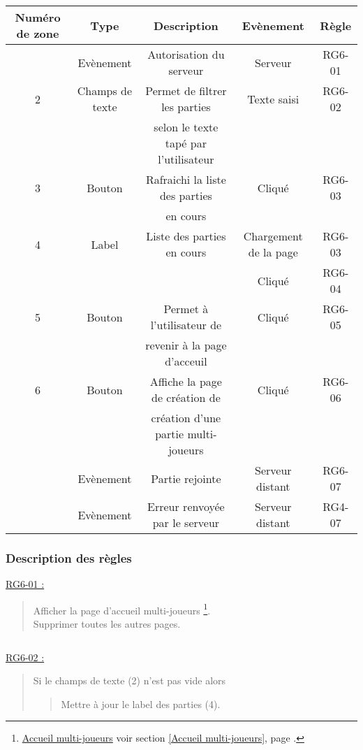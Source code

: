 \documentclass{report}
\begin{document}
			\begin{tabular}{|c|c|c|c|c|} \hline
				Numéro de zone & Type  & Description & Evènement &	Règle \\\hline
				  & Evènement & Autorisation du serveur & Serveur & RG6-01 \\\hline
				2 & Champs de texte & Permet de filtrer les parties & Texte saisi & RG6-02 \\
				  &                 & selon le texte tapé par l'utilisateur & & \\\hline
				3 & Bouton & Rafraichi la liste des parties & Cliqué & RG6-03 \\
				  &        & en cours & & \\\hline
				4 & Label & Liste des parties en cours & Chargement de la page & RG6-03 \\\
				  &       &                            & Cliqué & RG6-04 \\\hline
				5 & Bouton & Permet à l'utilisateur de & Cliqué & RG6-05 \\
				  &        & revenir à la page d'acceuil & & \\\hline
				6 & Bouton & Affiche la page de création de & Cliqué & RG6-06 \\
				  &        & création d'une partie multi-joueurs & & \\\hline
				  & Evènement & Partie rejointe & Serveur distant & RG6-07 \\\hline
				  & Evènement & Erreur renvoyée par le serveur & Serveur distant & RG4-07 \\\hline
				  
			\end{tabular}

		\subsubsection{Description des règles}

			\underline{RG6-01 :}
				\begin{quote}
					Afficher la page d'accueil multi-joueurs%
					\footnote[1]{
						\hyperlink{Accueil multi-joueurs}{Accueil multi-joueurs}
						\og voir section \ref{Accueil multi-joueurs}, page \pageref{Accueil multi-joueurs}.\fg
					}.\\
					Supprimer toutes les autres pages.
				\end{quote}

			$\,$

			\underline{RG6-02 :}
				\begin{quote}
					Si le champs de texte (2) n'est pas vide alors
					\begin{quote}	
						Mettre à jour le label des parties (4).
					\end{quote}					
				\end{quote}	
		
\end{document}
